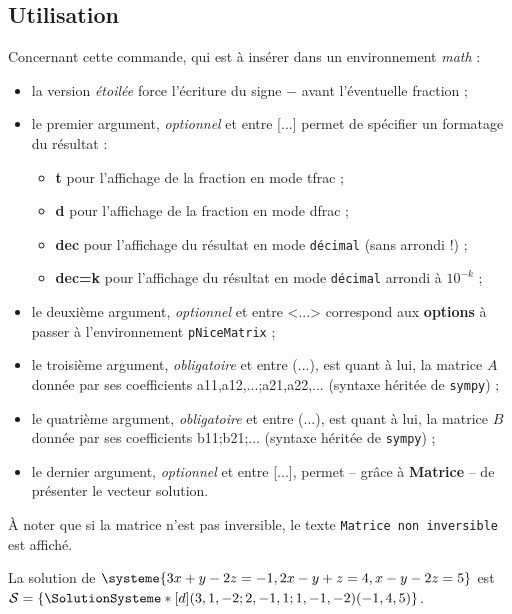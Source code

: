 \documentclass[a4paper,11pt]{article}
\newcommand\Cle[1]{{\bfseries\sffamily\textlangle #1\textrangle}}
\begin{document}
\subsection{Utilisation}

\begin{tipblock}
Concernant cette commande, qui est à insérer dans un environnement \textit{math} :

\begin{itemize}
	\item la version \textit{étoilée} force l'écriture du signe \og $-$ \fg{} avant l'éventuelle fraction ;
	\item le premier argument, \textit{optionnel} et entre \textsf{[...]} permet de spécifier un formatage du résultat :
	\begin{itemize}
		\item \Cle{t} pour l'affichage de la fraction en mode \textsf{tfrac} ;
		\item \Cle{d} pour l'affichage de la fraction en mode \textsf{dfrac} ;
		\item \Cle{dec} pour l'affichage du résultat en mode \texttt{décimal} (sans arrondi !) ;
		\item \Cle{dec=k} pour l'affichage du résultat en mode \texttt{décimal} arrondi à $10^{-k}$ ;
	\end{itemize}
	\item le deuxième argument, \textit{optionnel} et entre \textsf{<...>} correspond aux \Cle{options} à passer à l'environnement \texttt{pNiceMatrix} ;
	\item le troisième argument, \textit{obligatoire} et entre \textsf{(...)}, est quant à lui, la matrice $A$ donnée par ses coefficients \textsf{a11,a12,...;a21,a22,...} (syntaxe héritée de \texttt{sympy}) ;
	\item le quatrième argument, \textit{obligatoire} et entre \textsf{(...)}, est quant à lui, la matrice $B$ donnée par ses coefficients \textsf{b11;b21;...} (syntaxe héritée de \texttt{sympy}) ;
	\item le dernier argument, \textit{optionnel} et entre \textsf{[...]}, permet -- grâce à \Cle{Matrice} -- de présenter le vecteur solution.
\end{itemize}
À noter que si la matrice n'est pas inversible, le texte \texttt{Matrice non inversible} est affiché.
\end{tipblock}

\begin{PresentationCode}{}
La solution de $\systeme{3x+y-2z=-1,2x-y+z=4,x-y-2z=5}$ est $\mathcal{S}=%
\left\lbrace \SolutionSysteme*[d](3,1,-2;2,-1,1;1,-1,-2)(-1,4,5) \right\rbrace$.\\
\end{PresentationCode}
\end{document}
